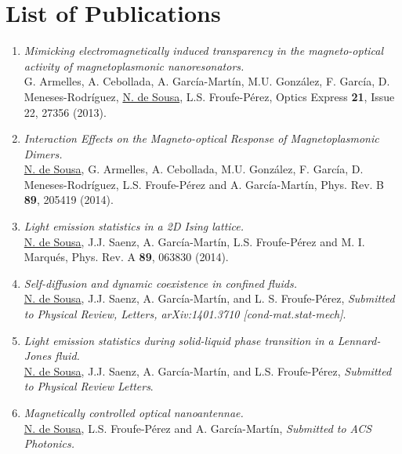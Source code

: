 \chapter{List of Publications}

\begin{enumerate}
\item \textit{Mimicking electromagnetically induced transparency in the magneto-optical activity of magnetoplasmonic nanoresonators.}\\ G. Armelles, A. Cebollada, A. Garc\'ia-Mart\'in, M.U. Gonz\'alez, F. Garc\'ia, D. Meneses-Rodr\'iguez, \underline{N. de Sousa}, L.S. Froufe-P\'erez,  Optics Express \textbf{21}, Issue 22, 27356 (2013).

\item \textit{Interaction Effects on the Magneto-optical Response of Magnetoplasmonic Dimers.}\\ \underline{N. de Sousa}, G. Armelles, A. Cebollada, M.U. Gonz\'alez, F. Garc\'ia, D. Meneses-Rodr\'iguez, L.S. Froufe-P\'erez and A. Garc\'ia-Mart\'in, Phys. Rev. B \textbf{89}, 205419 (2014).

\item \textit{Light emission statistics in a 2D Ising lattice.}\\ \underline{N. de Sousa}, J.J. Saenz, A. Garc\'ia-Mart\'in, L.S. Froufe-P\'erez and M. I. Marqu\'es, Phys. Rev. A \textbf{89}, 063830 (2014).

\item \textit{Self-diffusion and dynamic coexistence in confined fluids.}\\ \underline{N. de Sousa}, J.J. Saenz, A. Garc\'ia-Mart\'in, and L. S. Froufe-P\'erez, \textit{Submitted to Physical Review, Letters, arXiv:1401.3710 [cond-mat.stat-mech]}.

\item \textit{Light emission statistics during solid-liquid phase transition in a Lennard-Jones fluid.}\\ \underline{N. de Sousa}, J.J. Saenz, A. Garc\'ia-Mart\'in, and L.S. Froufe-P\'erez, \textit{Submitted to Physical Review Letters}.

\item \textit{Magnetically controlled optical nanoantennae.}\\ \underline{N. de Sousa}, L.S. Froufe-P\'erez and A. Garc\'ia-Mart\'in, \it{Submitted to ACS Photonics}.
\end{enumerate}
